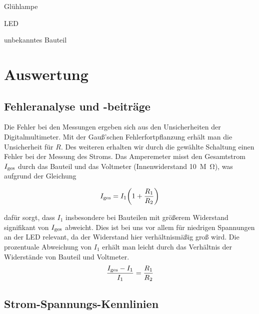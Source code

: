 \documentclass[parskip, 12pt, DIV=16, openany]{scrartcl}
\begin{document}
\begin{table}
\begin{center}

\end{center}
\caption{Glühlampe}
\label{tab2}
\end{table}


\begin{table}
\begin{center}

\end{center}
\caption{LED}
\label{tab3}
\end{table}
 

\begin{table}
\begin{center}

\end{center}
\caption{unbekanntes Bauteil}
\label{tab4}
\end{table}

\section{Auswertung}


\subsection{Fehleranalyse und -beiträge}

Die Fehler bei den Messungen ergeben sich aus den Unsicherheiten der Digitalmultimeter.
Mit der Gauß'schen Fehlerfortpflanzung erhält man die Unsicherheit für $R$. Des weiteren erhalten wir durch die gewählte Schaltung einen Fehler bei der Messung des Stroms. Das Amperemeter misst den Gesamtstrom $I_{\rm{ges}}$ durch das Bauteil und das Voltmeter (Innenwiderstand \SI{10}{M\ohm}), was aufgrund der Gleichung

\[
I_{\rm{ges}}= I_1\bigg(1+\frac{R_1}{R_2}\bigg)
\]

dafür sorgt, dass $I_1$ insbesondere bei Bauteilen mit größerem Widerstand signifikant von $I_{\rm{ges}}$ abweicht.
Dies ist bei uns vor allem für niedrigen Spannungen an der LED relevant, da der Widerstand hier verhältnismäßig groß wird.
Die prozentuale Abweichung von $I_1$ erhält man leicht durch das Verhältnis der Widerstände von Bauteil und Voltmeter.
\[
\frac{I_{\rm{ges}}-I_1}{I_1}= \frac{R_1}{R_2}
\]

\subsection{Strom-Spannungs-Kennlinien}
\end{document}
